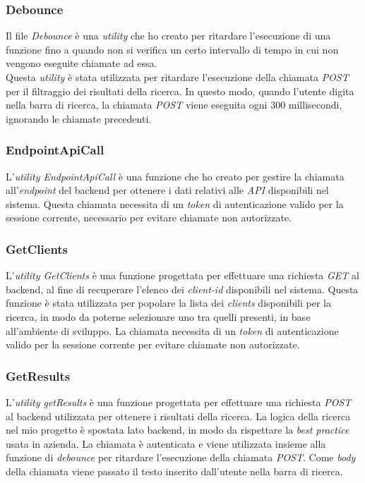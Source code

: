 \subsubsection{Debounce}\label{subsubsec:debounce}
Il file \textit{Debounce} è una \textit{utility} che ho creato per ritardare l'esecuzione di una funzione fino a quando non si verifica
un certo intervallo di tempo in cui non vengono eseguite chiamate ad essa.\\
Questa \textit{utility} è stata utilizzata per ritardare l'esecuzione della chiamata \textit{POST} per il filtraggio dei risultati della ricerca. 
In questo modo, quando l'utente digita nella barra di ricerca, la chiamata \textit{POST} viene eseguita ogni 300 millisecondi, ignorando le chiamate precedenti.

\subsubsection{EndpointApiCall}\label{subsubsec:endpoint-api-call}
L'\textit{utility EndpointApiCall} è una funzione che ho creato per gestire la chiamata all'\textit{endpoint} del backend per ottenere
i dati relativi alle \textit{API} disponibili nel sistema.
Questa chiamata necessita di un \textit{token} di autenticazione valido per la sessione corrente, necessario per evitare chiamate non autorizzate.

\subsubsection{GetClients}\label{subsubsec:get-clients}
L'\textit{utility GetClients} è una funzione progettata per effettuare una richiesta \textit{GET} al backend, al fine di recuperare 
l'elenco dei \textit{client-id} disponibili nel sistema. Questa funzione è stata utilizzata per popolare la lista dei \textit{clients} disponibili
per la ricerca, in modo da poterne selezionare uno tra quelli presenti, in base all'ambiente di sviluppo.
La chiamata necessita di un \textit{token} di autenticazione valido per la sessione corrente per evitare chiamate non autorizzate.

\subsubsection{GetResults}\label{subsubsec:get-results}
L'\textit{utility getResults} è una funzione progettata per effettuare una richiesta \textit{POST} al backend utilizzata per ottenere i risultati della ricerca. 
La logica della ricerca nel mio progetto è spostata lato backend, in modo da rispettare la \textit{best practice} usata in azienda.
La chiamata è autenticata e viene utilizzata insieme alla funzione di \textit{debounce} per ritardare l'esecuzione della chiamata \textit{POST}. Come \textit{body} della chiamata
viene passato il testo inserito dall'utente nella barra di ricerca.

